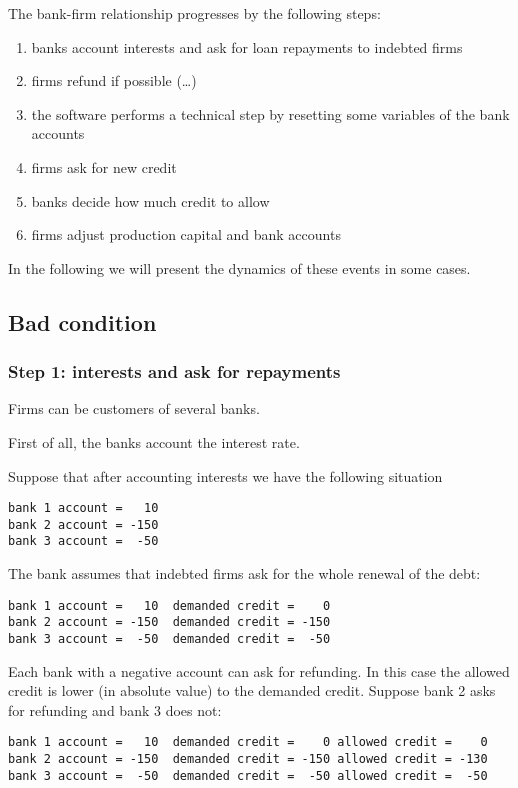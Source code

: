 \documentclass{article}
\begin{document}
The bank-firm relationship progresses by the following steps:

\begin{enumerate}
	\item banks account interests and ask for loan repayments to indebted firms
	\item firms refund if possible (\dots)
	\item the software performs a technical step by resetting some variables of the bank accounts
	\item firms ask for new credit
	\item banks decide how much credit to allow
	\item firms adjust production capital and bank accounts
\end{enumerate}
In the following we will present the dynamics of these events in some cases.

\subsection{Bad condition}
\subsubsection*{Step 1: interests and ask for repayments}
Firms can be customers of several banks.

First of all, the banks account the interest rate.

Suppose that after accounting interests we have the following situation
\begin{verbatim}
bank 1 account =   10
bank 2 account = -150
bank 3 account =  -50
\end{verbatim}

The bank assumes that indebted firms ask for the whole renewal of the debt:

\begin{verbatim}
bank 1 account =   10  demanded credit =    0
bank 2 account = -150  demanded credit = -150
bank 3 account =  -50  demanded credit =  -50
\end{verbatim}

Each bank with a negative account can ask for refunding. In this case the allowed credit is lower (in absolute value) to the demanded credit.
Suppose bank 2 asks for refunding and bank 3 does not:

\begin{verbatim}
bank 1 account =   10  demanded credit =    0 allowed credit =    0
bank 2 account = -150  demanded credit = -150 allowed credit = -130 
bank 3 account =  -50  demanded credit =  -50 allowed credit =  -50
\end{verbatim}
\end{document}
